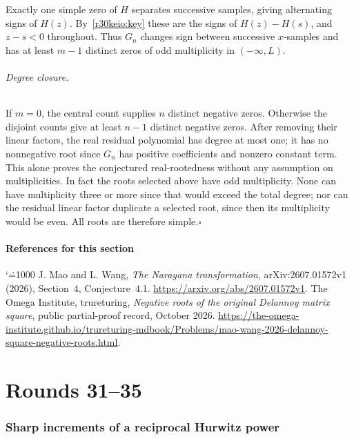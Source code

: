 \documentclass[11pt,a4paper]{article}
\makeatletter
\numberwithin{equation}{section}
\theoremstyle{definition}
\theoremstyle{remark}
\renewenvironment{thebibliography}[1]
 {\subsection*{References for this section}\small
  \list{\@biblabel{\@arabic\c@enumiv}}
       {\settowidth\labelwidth{\@biblabel{#1}}\leftmargin\labelwidth
        \advance\leftmargin\labelsep\@openbib@code
        \usecounter{enumiv}\let\p@enumiv\@empty
        \renewcommand\theenumiv{\@arabic\c@enumiv}}
  \sloppy\clubpenalty4000\widowpenalty4000\sfcode`\.=1000\relax}
 {\def\@noitemerr{\@latex@warning{Empty bibliography}}\endlist}
\makeatother
\begin{document}
Exactly one simple zero of $H$ separates successive samples, giving alternating signs of $H(z)$. By~\eqref{r30keio:key} these are the signs of $H(z)-H(s)$, and $z-s<0$ throughout. Thus $G_n$ changes sign between successive $x$-samples and has at least $m-1$ distinct zeros of odd multiplicity in $(-\infty,L)$.

\paragraph{Degree closure.}
If $m=0$, the central count supplies $n$ distinct negative zeros. Otherwise the disjoint counts give at least $n-1$ distinct negative zeros. After removing their linear factors, the real residual polynomial has degree at most one; it has no nonnegative root since $G_n$ has positive coefficients and nonzero constant term. This alone proves the conjectured real-rootedness without any assumption on multiplicities. In fact the roots selected above have odd multiplicity. None can have multiplicity three or more since that would exceed the total degree; nor can the residual linear factor duplicate a selected root, since then its multiplicity would be even. All roots are therefore simple.\hfill$\square$

\begin{thebibliography}{9}
 J. Mao and L. Wang, \emph{The Narayana transformation}, arXiv:2607.01572v1 (2026), Section~4, Conjecture~4.1. \url{https://arxiv.org/abs/2607.01572v1}.
 The Omega Institute, trureturing, \emph{Negative roots of the original Delannoy matrix square}, public partial-proof record, October 2026. \url{https://the-omega-institute.github.io/trureturing-mdbook/Problems/mao-wang-2026-delannoy-square-negative-roots.html}.
\end{thebibliography}

\par\endgroup
\clearpage
\part{Rounds 31--35}

\begingroup

\section{\texorpdfstring{Sharp increments of a reciprocal Hurwitz power}{Sharp increments of a reciprocal Hurwitz power}}\label{section:r31meiji}
\par\medskip
\end{document}
